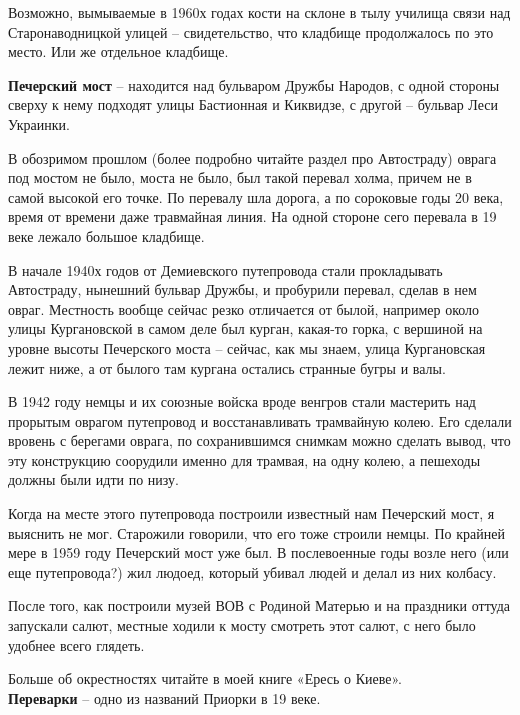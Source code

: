 Возможно, вымываемые в 1960х годах кости на склоне в тылу училища связи над Старонаводницкой улицей – свидетельство, что  кладбище продолжалось по это место. Или же отдельное кладбище.\\

\medskip

\textbf{Печерский мост} – находится над бульваром Дружбы Народов, с одной стороны сверху к нему подходят улицы Бастионная и Киквидзе, с другой – бульвар Леси Украинки.

В обозримом прошлом (более подробно читайте раздел про Автостраду) оврага под мостом не было, моста не было, был такой перевал холма, причем не в самой высокой его точке. По перевалу шла дорога, а по сороковые годы 20 века, время от времени даже травмайная линия. На одной стороне сего перевала в 19 веке лежало большое кладбище.

В начале 1940х годов от Демиевского путепровода стали прокладывать Автостраду, нынешний бульвар Дружбы, и пробурили перевал, сделав в нем овраг. Местность вообще сейчас резко отличается от былой, например около улицы Кургановской в самом деле был курган, какая-то горка, с вершиной на уровне высоты Печерского моста – сейчас, как мы знаем, улица Кургановская лежит ниже, а от былого там кургана остались странные бугры и валы. 

В 1942 году немцы и их союзные войска вроде венгров стали мастерить над прорытым оврагом путепровод и восстанавливать трамвайную колею. Его сделали вровень с берегами оврага, по сохранившимся снимкам можно сделать вывод, что эту конструкцию соорудили именно для трамвая, на одну колею, а пешеходы должны были идти по низу.

Когда на месте этого путепровода построили известный нам Печерский мост, я выяснить не мог. Старожили говорили, что его тоже строили немцы. По крайней мере в 1959 году Печерский мост уже был. В послевоенные годы возле него (или еще путепровода?) жил людоед, который убивал людей и делал из них колбасу.

После того, как построили музей ВОВ с Родиной Матерью и на праздники оттуда запускали салют, местные ходили к мосту смотреть этот салют, с него было удобнее всего глядеть.

Больше об окрестностях читайте в моей книге «Ересь о Киеве».\\

\textbf{Переварки} – одно из названий Приорки в 19 веке.\\

\medskip

